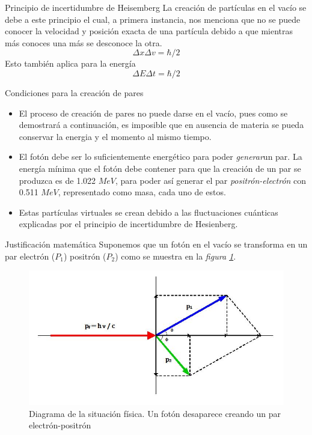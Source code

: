 \documentclass{beamer}
\begin{document}
\begin{frame}{Principio de incertidumbre de Heisemberg}
    La creación de partículas en el vacío se debe a este principio el cual, a primera instancia, nos menciona que no se puede conocer la velocidad y posición exacta de una partícula debido a que mientras más conoces una más se desconoce la otra.
    \begin{equation*}
        \Delta x \Delta v = \hbar/2
    \end{equation*}
    Esto también aplica para la energía
    \begin{equation*}
        \Delta E \Delta t = \hbar/2
    \end{equation*}
\end{frame}
\begin{frame}{Condiciones para la creaci\'on de pares}
\begin{itemize}
    \item El proceso de creaci\'on de pares no puede darse en el vac\'io, pues como se demostrar\'a a continuaci\'on, es imposible que en ausencia de materia se pueda conservar la energia y el momento al mismo tiempo.
    \item El fotón debe ser lo suficientemente energético para poder \textit{generar}un par. La energía mínima que el fotón debe contener para que la creación de un par se produzca es de 1.022 $MeV$, para poder así generar el par \textit{positrón-electrón} con 0.511 $MeV$, representado como masa, cada uno de estos.
    \item Estas partículas virtuales se crean debido a las fluctuaciones cuánticas explicadas por el principio de incertidumbre de Hesienberg.
\end{itemize}
\end{frame}



\begin{frame}{Justificaci\'on matem\'atica}
    Suponemos que un fotón en el vac\'io se transforma en un par electr\'on ($P_1$) positr\'on ($P_2$) como se muestra en la \textit{figura \ref{fig:jm_cracion}}.
        
    \begin{figure}[h]
    \includegraphics[scale=.40]{Dibujo_Pares.jpg}
    \caption{\label{fig:jm_cracion}Diagrama de la situaci\'on f\'isica. Un fot\'on desaparece creando un par electr\'on-positr\'on}
    \end{figure}
\end{frame}
\end{document}
